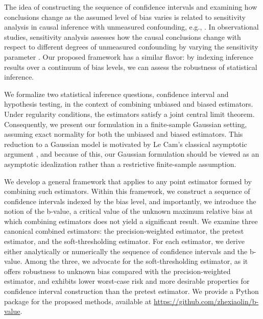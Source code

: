 \documentclass[11pt]{article}
\numberwithin{equation}{section}
\theoremstyle{definition}
\begin{document}
The idea of constructing the sequence of confidence intervals and examining how conclusions change as the assumed level of bias varies is related to sensitivity analysis in causal inference with unmeasured confounding, e.g., \cite{cornfield1959smoking,rosenbaum1983assessing,vanderweele2017sensitivity}. In observational studies, sensitivity analysis assesses
how the causal conclusions change with respect to different degrees of unmeasured confounding by varying the sensitivity parameter \citep{rosenbaum2002observational,ding2016sensitivity}. Our proposed framework has a similar flavor: by indexing inference results over a continuum of bias levels, we can assess the robustness of statistical inference.

We formalize two statistical inference questions, confidence interval and hypothesis testing, in the context of combining unbiased and biased estimators. 
Under regularity conditions,
the estimators satisfy a joint central limit theorem. Consequently, we present our formulation in a finite-sample Gaussian setting, assuming exact normality for both the unbiased and biased estimators. This reduction to a Gaussian model is motivated by Le Cam’s classical asymptotic argument \citep{le1956asymptotic}, 
and because of this, our Gaussian formulation should be viewed as an asymptotic idealization rather than a restrictive finite-sample assumption.

We develop a general framework that applies to any point estimator formed by combining such estimators. Within this framework, we construct a sequence of confidence intervals indexed by the bias level, and importantly, we introduce the notion of the b-value, a critical value of the unknown maximum relative bias at which combining estimators does not yield a significant result. We examine three canonical combined estimators: the precision-weighted estimator, the pretest estimator, and the soft-thresholding estimator. For each estimator, we derive either analytically or numerically the sequence of confidence intervals and the b-value. Among the three, we advocate for the soft-thresholding estimator, as it offers robustness to unknown bias compared with the precision-weighted estimator, and exhibits lower worst-case risk and more desirable properties for confidence interval construction than the pretest estimator. We provide a Python package for the proposed methods, available at \url{https://github.com/zhexiaolin/b-value}.
\end{document}
